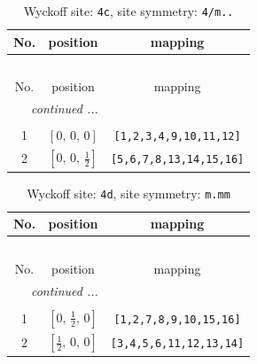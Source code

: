 \documentclass[fleqn,8pt]{jsarticle}
\begin{document}
\renewcommand{\arraystretch}{1.2}
\begin{longtable}{ccc}
\caption{Wyckoff site: {\tt 4c}, site symmetry: {\tt 4/m..}}
 \\
 \hline \hline
No. & position & mapping \\ \hline \endfirsthead

\multicolumn{2}{l}{\tablename\ \thetable{}} \\
 \hline \hline
No. & position & mapping \\ \hline \endhead

 \hline \hline
\multicolumn{2}{r}{\footnotesize\it continued ...} \\ \endfoot

 \hline \hline
\multicolumn{2}{r}{} \\ \endlastfoot

1 & $\left[ 0,\, 0,\, 0 \right]$ & {\tt [1,2,3,4,9,10,11,12]} \\ \hline
2 & $\left[ 0,\, 0,\, \frac{1}{2} \right]$ & {\tt [5,6,7,8,13,14,15,16]} \\
\end{longtable}
\renewcommand{\arraystretch}{1.2}
\begin{longtable}{ccc}
\caption{Wyckoff site: {\tt 4d}, site symmetry: {\tt m.mm}}
 \\
 \hline \hline
No. & position & mapping \\ \hline \endfirsthead

\multicolumn{2}{l}{\tablename\ \thetable{}} \\
 \hline \hline
No. & position & mapping \\ \hline \endhead

 \hline \hline
\multicolumn{2}{r}{\footnotesize\it continued ...} \\ \endfoot

 \hline \hline
\multicolumn{2}{r}{} \\ \endlastfoot

1 & $\left[ 0,\, \frac{1}{2},\, 0 \right]$ & {\tt [1,2,7,8,9,10,15,16]} \\ \hline
2 & $\left[ \frac{1}{2},\, 0,\, 0 \right]$ & {\tt [3,4,5,6,11,12,13,14]} \\
\end{longtable}
\renewcommand{\arraystretch}{1.2}
\end{document}
